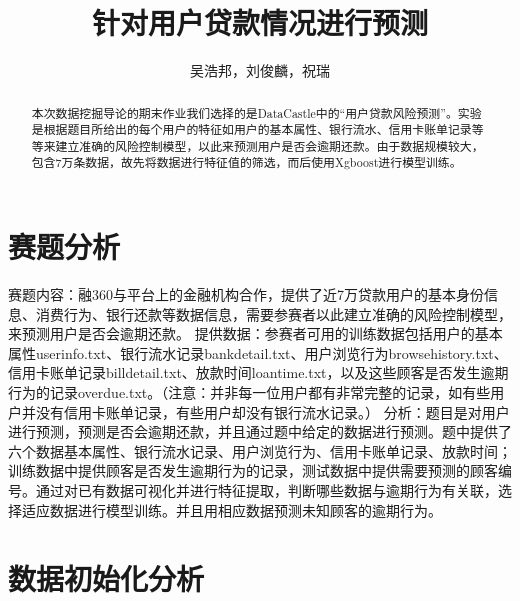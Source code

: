 \documentclass{article}
\title{针对用户贷款情况进行预测}
\author{吴浩邦，刘俊麟，祝瑞}
\begin{document}
\maketitle

\begin{abstract}
本次数据挖掘导论的期末作业我们选择的是DataCastle中的“用户贷款风险预测”。实验是根据题目所给出的每个用户的特征如用户的基本属性、银行流水、信用卡账单记录等等来建立准确的风险控制模型，以此来预测用户是否会逾期还款。由于数据规模较大，包含7万条数据，故先将数据进行特征值的筛选，而后使用Xgboost进行模型训练。
\end{abstract}

\section{赛题分析}
赛题内容：融360与平台上的金融机构合作，提供了近7万贷款用户的基本身份信息、消费行为、银行还款等数据信息，需要参赛者以此建立准确的风险控制模型，来预测用户是否会逾期还款。
提供数据：参赛者可用的训练数据包括用户的基本属性user\textunderscore info.txt、银行流水记录bank\textunderscore detail.txt、用户浏览行为browse\textunderscore history.txt、信用卡账单记录bill\textunderscore detail.txt、放款时间loan\textunderscore time.txt，以及这些顾客是否发生逾期行为的记录overdue.txt。（注意：并非每一位用户都有非常完整的记录，如有些用户并没有信用卡账单记录，有些用户却没有银行流水记录。）
分析：题目是对用户进行预测，预测是否会逾期还款，并且通过题中给定的数据进行预测。题中提供了六个数据基本属性、银行流水记录、用户浏览行为、信用卡账单记录、放款时间；训练数据中提供顾客是否发生逾期行为的记录，测试数据中提供需要预测的顾客编号。通过对已有数据可视化并进行特征提取，判断哪些数据与逾期行为有关联，选择适应数据进行模型训练。并且用相应数据预测未知顾客的逾期行为。

\section{数据初始化分析}
\end{document}
